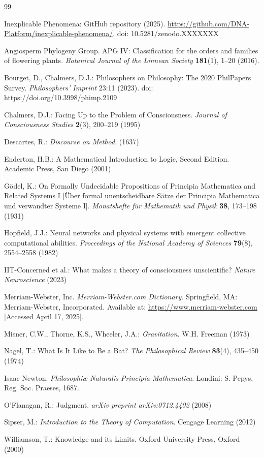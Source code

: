 \documentclass[runningheads]{llncs}
\begin{document}
\begin{thebibliography}{99}

Inexplicable Phenomena: GitHub repository (2025). \url{https://github.com/DNA-Platform/inexplicable-phenomena/}. doi: 10.5281/zenodo.XXXXXXX

Angiosperm Phylogeny Group. APG IV: Classification for the orders and families of flowering plants. \textit{Botanical Journal of the Linnean Society} \textbf{181}(1), 1–20 (2016).

Bourget, D., Chalmers, D.J.: Philosophers on Philosophy: The 2020 PhilPapers Survey. \textit{Philosophers' Imprint} 23:11 (2023). doi: https://doi.org/10.3998/phimp.2109

Chalmers, D.J.: Facing Up to the Problem of Consciousness. \textit{Journal of Consciousness Studies} \textbf{2}(3), 200--219 (1995)

Descartes, R.: \textit{Discourse on Method}. (1637)

Enderton, H.B.: A Mathematical Introduction to Logic, Second Edition. Academic Press, San Diego (2001)

Gödel, K.: On Formally Undecidable Propositions of Principia Mathematica and Related Systems I [Über formal unentscheidbare Sätze der Principia Mathematica und verwandter Systeme I]. \textit{Monatshefte für Mathematik und Physik} \textbf{38}, 173--198 (1931)

Hopfield, J.J.: Neural networks and physical systems with emergent collective computational abilities. \textit{Proceedings of the National Academy of Sciences} \textbf{79}(8), 2554--2558 (1982)

IIT-Concerned et al.: What makes a theory of consciousness unscientific? \textit{Nature Neuroscience} (2023)

Merriam-Webster, Inc. \emph{Merriam-Webster.com Dictionary}. Springfield, MA: Merriam-Webster, Incorporated. Available at: \url{https://www.merriam-webster.com} [Accessed April 17, 2025].

Misner, C.W., Thorne, K.S., Wheeler, J.A.: \textit{Gravitation}. W.H. Freeman (1973)

Nagel, T.: What Is It Like to Be a Bat? \textit{The Philosophical Review} \textbf{83}(4), 435--450 (1974)

Isaac Newton. \emph{Philosophiæ Naturalis Principia Mathematica}. Londini: S. Pepys, Reg. Soc. Praeses, 1687.

O'Flanagan, R.: Judgment. \textit{arXiv preprint arXiv:0712.4402} (2008)

Sipser, M.: \textit{Introduction to the Theory of Computation}. Cengage Learning (2012)

Williamson, T.: Knowledge and its Limits. Oxford University Press, Oxford (2000)
	
\end{thebibliography}
\end{document}
